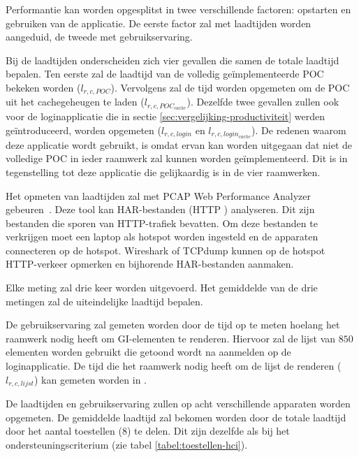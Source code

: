 Performantie kan worden opgesplitst in twee verschillende factoren: opstarten en gebruiken van de applicatie.
De eerste factor zal met laadtijden worden aangeduid,  de tweede met gebruikservaring.

Bij de laadtijden onderscheiden zich vier gevallen die samen de totale laadtijd bepalen.
Ten eerste zal de laadtijd van de volledig geïmplementeerde POC bekeken worden ($l_{r,c,POC}$). 
Vervolgens zal de tijd worden opgemeten om de POC uit het cachegeheugen te laden ($l_{r,c,POC_{cache}}$).
Dezelfde twee gevallen zullen ook voor de loginapplicatie die in sectie \ref{sec:vergelijking-productiviteit} werden geïntroduceerd, worden opgemeten ($l_{r,c,login}$ en $l_{r,c,login_{cache}}$).
De redenen waarom deze applicatie wordt gebruikt, is omdat ervan kan worden uitgegaan dat niet de volledige POC in ieder raamwerk zal kunnen worden geïmplementeerd. 
Dit is in tegenstelling tot deze applicatie die gelijkaardig is in de vier raamwerken.

Het opmeten van laadtijden zal met PCAP Web Performance Analyzer gebeuren~\cite{SongL.bmcquadeMdsteele2010}.
Deze tool kan HAR-bestanden (HTTP ) analyseren.
Dit zijn bestanden die sporen van HTTP-trafiek bevatten.
Om deze bestanden te verkrijgen moet een laptop als hotspot worden ingesteld en de apparaten connecteren op de hotspot.
Wireshark of TCPdump kunnen op de hotspot HTTP-verkeer opmerken en bijhorende HAR-bestanden aanmaken.

Elke meting zal drie keer worden uitgevoerd. %
Het gemiddelde van de drie metingen zal de uiteindelijke laadtijd bepalen. %


De gebruikservaring zal gemeten worden door de tijd op te meten hoelang het raamwerk nodig heeft om GI-elementen te renderen.
Hiervoor zal de lijst van $850$ elementen worden gebruikt die getoond wordt na aanmelden op de loginapplicatie.
De tijd die het raamwerk nodig heeft om de lijst de renderen ($l_{r,c,lijst}$) kan gemeten worden in \js.

De laadtijden en gebruikservaring zullen op acht verschillende apparaten worden opgemeten.
De gemiddelde laadtijd zal bekomen worden door de totale laadtijd door het aantal toestellen ($8$) te delen.
Dit zijn dezelfde als bij het ondersteuningscriterium (zie tabel \ref{tabel:toestellen-hci}).

